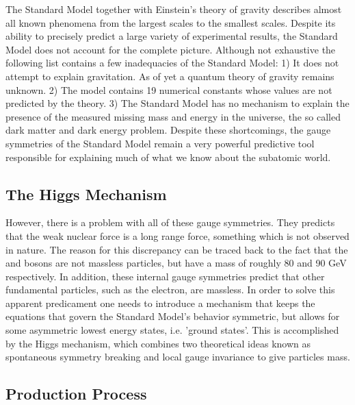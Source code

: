 The Standard Model together with Einstein's theory of gravity describes almost
all known phenomena from the largest scales to the smallest scales. Despite
its ability to precisely predict a large variety of experimental results, the
Standard Model does not account for the complete picture. Although not exhaustive
the following list contains a few inadequacies of the Standard Model:
1) It does not attempt to explain gravitation. As of yet a quantum theory of
gravity remains unknown.
2) The model contains 19 numerical constants whose values are not predicted
by the theory.
3) The Standard Model has no mechanism to explain the presence of the measured
missing mass and energy in the universe, the so called dark matter and dark energy 
problem. Despite these shortcomings, the gauge symmetries of the Standard Model 
remain a very powerful predictive tool responsible for explaining much of
what we know about the subatomic world.


\subsection{The Higgs Mechanism}
\label{subsec:higgsmec}
However, there is a problem with all of these gauge symmetries.
They predicts that the weak nuclear force is a long
range force, something which is not observed in nature. The reason for this
discrepancy can be traced back to the fact that the \WBoson and \ZBoson bosons are
not massless particles, but have a mass of roughly 80 and 90 GeV respectively. 
In addition, these internal gauge symmetries predict that other 
fundamental particles, such as the electron, are massless. In order to solve
this apparent predicament one needs to introduce a mechanism that keeps the
equations that govern the Standard Model's behavior symmetric, but allows for
some asymmetric lowest energy states, i.e. 'ground states'. 
This is accomplished by the Higgs mechanism, which combines two theoretical ideas
known as spontaneous symmetry breaking and local gauge invariance to give particles 
mass.

\subsection{Production Process}
\label{subsec:prodproc}

